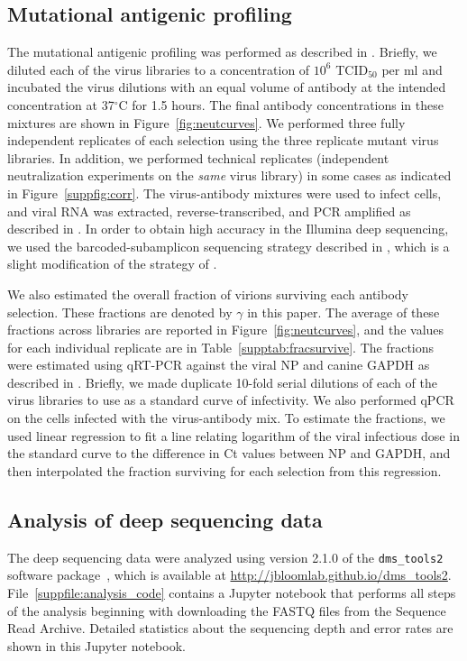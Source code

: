 \documentclass[11pt]{article}
\begin{document}
\subsection*{Mutational antigenic profiling}
The mutational antigenic profiling was performed as described in \citet{doud2017complete}. 
Briefly, we diluted each of the virus libraries to a concentration of $10^{6}$ TCID$_{50}$ per ml and incubated the virus dilutions with an equal volume of antibody at the intended concentration at 37$^\circ$C for 1.5 hours.
The final antibody concentrations in these mixtures are shown in Figure~\ref{fig:neutcurves}.
We performed three fully independent replicates of each selection using the three replicate mutant virus libraries.
In addition, we performed technical replicates (independent neutralization experiments on the \emph{same} virus library) in some cases as indicated in Figure~\ref{suppfig:corr}.
The virus-antibody mixtures were used to infect cells, and viral RNA was extracted, reverse-transcribed, and PCR amplified as described in \citet{doud2017complete}.
In order to obtain high accuracy in the Illumina deep sequencing, we used the barcoded-subamplicon sequencing strategy described in \citet{doud2017complete}, which is a slight modification of the strategy of \citet{wu2014high}.

We also estimated the overall fraction of virions surviving each antibody selection.
These fractions are denoted by $\gamma$ in this paper.
The average of these fractions across libraries are reported in Figure~\ref{fig:neutcurves}, and the values for each individual replicate are in Table~\ref{supptab:fracsurvive}.
The fractions were estimated using qRT-PCR against the viral NP and canine GAPDH as described in \citet{doud2017complete}.
Briefly, we made duplicate 10-fold serial dilutions of each of the virus libraries to use as a standard curve of infectivity.
We also performed qPCR on the cells infected with the virus-antibody mix.
To estimate the fractions, we used linear regression to fit a line relating logarithm of the viral infectious dose in the standard curve to the difference in Ct values between NP and GAPDH, and then interpolated the fraction surviving for each selection from this regression.

\subsection*{Analysis of deep sequencing data}
The deep sequencing data were analyzed using version 2.1.0 of the \texttt{dms\_tools2} software package~\citep{bloom2015software}, which is available at \url{http://jbloomlab.github.io/dms_tools2}.
File~\ref{suppfile:analysis_code} contains a Jupyter notebook that performs all steps of the analysis beginning with downloading the FASTQ files from the Sequence Read Archive.
Detailed statistics about the sequencing depth and error rates are shown in this Jupyter notebook.
\end{document}
